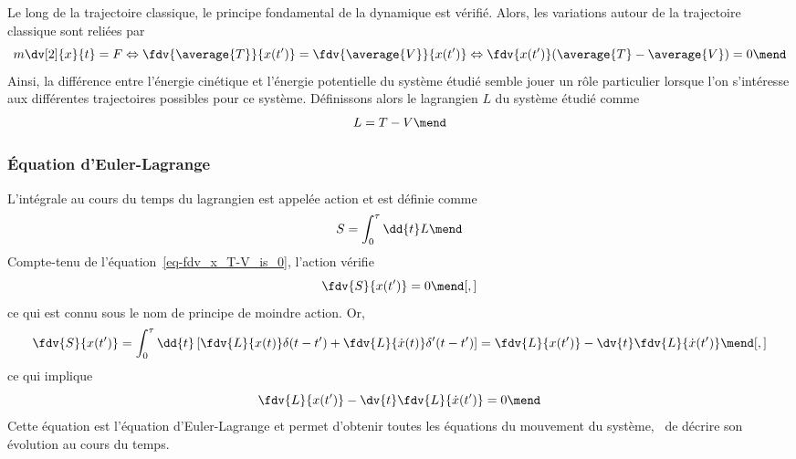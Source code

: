 Le long de la trajectoire classique, le principe fondamental de la dynamique est vérifié. Alors, les variations autour de la trajectoire classique sont reliées par
\begin{equation}
m\dv[2]{x}{t} = F
\Leftrightarrow
\fdv{\average{T}}{x(t')} = \fdv{\average{V}}{x(t')}
\Leftrightarrow
\fdv{x(t')}(\average{T}-\average{V}) = 0 \label{eq-fdv_x_T-V_is_0}
\mend
\end{equation}
Ainsi, la différence entre l'énergie cinétique et l'énergie potentielle du système étudié semble jouer un rôle particulier lorsque l'on s'intéresse aux différentes trajectoires possibles pour ce système. Définissons alors le lagrangien $L$ du système étudié comme
\begin{equation}
L = T-V
\mend
\end{equation}
\subsubsection{Équation d'Euler-Lagrange}\label{chapter-MS-MSSM-section-formalisme-subsec-into_lagrangien-subsubsec-euler-lagrange}
L'intégrale au cours du temps du lagrangien est appelée action et est définie comme
\begin{equation}
S = \int_0^\tau\dd{t}L
\mend
\end{equation}
Compte-tenu de l'équation~\eqref{eq-fdv_x_T-V_is_0}, l'action vérifie
\begin{equation}
\fdv{S}{x(t')}=0
\mend[,]
\end{equation}
ce qui est connu sous le nom de principe de moindre action. Or,
\begin{equation}
\fdv{S}{x(t')}
= \int_0^\tau\dd{t} \left[ \fdv{L}{x(t)}\delta(t-t') + \fdv{L}{\dot{x}(t)}\delta'(t-t')\right]
= \fdv{L}{x(t')} - \dv{t}\fdv{L}{\dot{x}(t')}
\mend[,]
\end{equation}
ce qui implique
\begin{equation}
\fdv{L}{x(t')} - \dv{t}\fdv{L}{\dot{x}(t')} = 0
\mend
\end{equation}
Cette équation est l'équation d'Euler-Lagrange et permet d'obtenir toutes les équations du mouvement du système, \ie\ de décrire son évolution au cours du temps.

